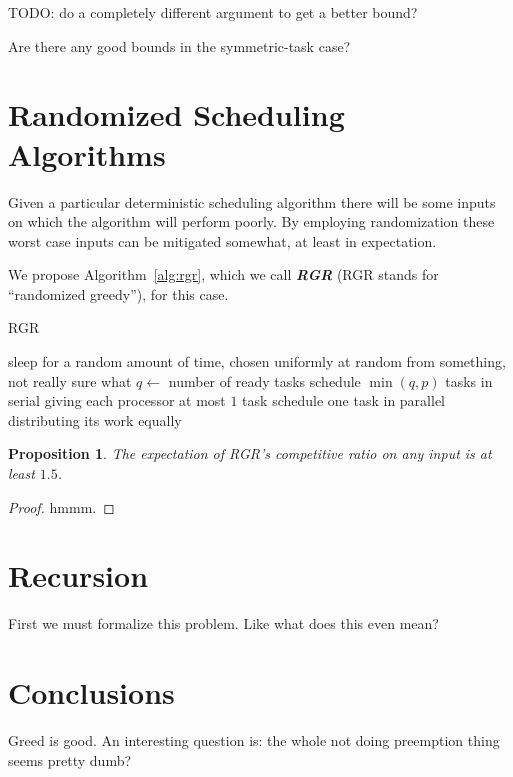\documentclass[twocolumn]{article}[10pt]
\newcommand{\defn}[1]{{\textit{\textbf{\boldmath #1}}}\xspace}
\newtheorem{proposition}{Proposition}
\begin{document}
{\color{red} 
TODO: do a completely different argument to get a better bound?

Are there any good bounds in the symmetric-task case?
}

\section{Randomized Scheduling Algorithms}
Given a particular deterministic scheduling algorithm there will
be some inputs on which the algorithm will perform poorly. 
By employing randomization these worst case inputs can be
mitigated somewhat, at least in expectation.

We propose Algorithm~\ref{alg:rgr}, which we call
\defn{RGR} (RGR stands for \enquote{randomized greedy}), for this case.

\begin{algorithm}
  \caption{RGR}
  \label{alg:rgr}
  \begin{algorithmic}
        \State sleep for a random amount of time, chosen
        uniformly at random from something, not really sure what 
        \State $q \gets $ number of ready tasks
          \State schedule $\min(q, p)$ tasks in serial
          \State giving each processor at most $1$ task
        \Else
          \State schedule one task in parallel
          \State distributing its work equally 
        \EndIf
      \EndIf
    \EndWhile
  \end{algorithmic}
\end{algorithm}

\begin{proposition}
  The expectation of RGR's competitive ratio on any input
  is at least $1.5$.
\end{proposition}
\begin{proof}
 hmmm. 
\end{proof}


\section{Recursion}
First we must formalize this problem. Like what does
this even mean?

\section{Conclusions}
Greed is good. 
An interesting question is: the whole not doing preemption thing seems pretty dumb? 



\end{document}
